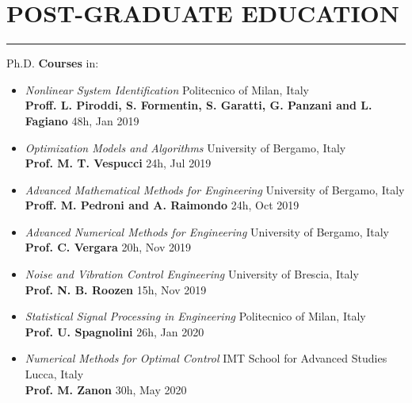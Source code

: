 \documentclass[10pt]{article}
\newcommand{\cvsection}[1]{\section*{\centering\normalsize\uppercase{#1}}\vspace{-16pt}\rule{\linewidth}{0.2pt}\vspace{6pt}}
\begin{document}
\cvsection{post-graduate education}
Ph.D. \textbf{Courses} in:
\begin{itemize}	
	\setlength\itemsep{-6pt}
	\renewcommand\labelitemi{$\vcenter{\hbox{\tiny$\bullet$}}$}

	\item \textit{Nonlinear System Identification} \hfill Politecnico of Milan, Italy\\
	\textbf{Proff. L. Piroddi, S. Formentin, S. Garatti, G. Panzani and L. Fagiano} \hfill 48h, Jan 2019\\
	
	\item \textit{Optimization Models and Algorithms} \hfill University of Bergamo, Italy\\
	\textbf{Prof. M. T. Vespucci} \hfill 24h, Jul 2019\\
	 
	\item \textit{Advanced Mathematical Methods for Engineering} \hfill University of Bergamo, Italy\\
	\textbf{Proff. M. Pedroni and A. Raimondo} \hfill 24h, Oct 2019\\
	 
	\item \textit{Advanced Numerical Methods for Engineering} \hfill University of Bergamo, Italy\\
	\textbf{Prof. C. Vergara} \hfill 20h, Nov 2019\\
	 

	\item \textit{Noise and Vibration Control Engineering} \hfill University of Brescia, Italy\\
	\textbf{Prof. N. B. Roozen} \hfill 15h, Nov 2019\\
	
	\item \textit{Statistical Signal Processing in Engineering} \hfill Politecnico of Milan, Italy\\
	\textbf{Prof. U. Spagnolini} \hfill 26h, Jan 2020\\
	 
	\item \textit{Numerical Methods for Optimal Control} \hfill IMT School for Advanced Studies Lucca, Italy\\
	\textbf{Prof. M. Zanon} \hfill 30h, May 2020\\
	

\end{itemize}
\end{document}
